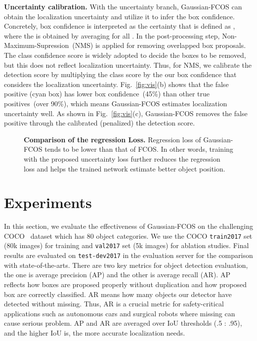\documentclass[final]{cvpr}
\begin{document}
\medskip

\noindent
\textbf{Uncertainty calibration.} With the uncertainty branch, Gaussian-FCOS can obtain the localization uncertainty  and utilize it to infer the box confidence.
Concretely, box confidence is interpreted as the certainty that is defined as , where the  is obtained by averaging  for all . 
In the post-processing step, Non-Maximum-Supression~(NMS) is applied for removing overlapped box proposals. 
The class confidence score is widely adopted to decide the boxes to be removed, but this does not reflect localization uncertainty.
Thus, for NMS, we calibrate the detection score by multiplying the class score by the our box confidence  that considers the localization uncertainty.
Fig.~\ref{fig:vis}(b) shows that the false positive (cyan box) has lower box confidence~(45\%) than other true positives~(over 90\%), which means Gaussian-FCOS estimates localization uncertainty well.
As shown in Fig.~\ref{fig:vis}(c), Gaussian-FCOS removes the false positive through the calibrated (penalized) the detection score.



\begin{figure}[t]
  \centering
  \caption{
    \textbf{Comparison of the regression Loss.} 
    Regression loss of Gaussian-FCOS tends to be lower than that of FCOS. 
In other words, training with the proposed uncertainty loss further reduces the regression loss and helps the trained network estimate better object position.
    }
  \label{fig:loss}
\end{figure}




\section{Experiments}
In this section, we evaluate the effectiveness of Gaussian-FCOS on the challenging COCO~\cite{lin2014microsoft} dataset which has 80 object categories.
We use the COCO \texttt{train2017} set (80k images) for training and \texttt{val2017} set (5k images) for ablation studies.
Final results are evaluated on \texttt{test-dev2017} in the evaluation server for the comparison with state-of-the-arts.
There are two key metrics for object detection evaluation, the one is average precision (AP) and the other is average recall (AR).
AP reflects how boxes are proposed properly without duplication and how proposed box are correctly classified.
AR means how many objects our detector have detected without missing.
Thus, AR is a crucial metric for safety-critical applications such as autonomous cars and surgical robots where missing can cause serious problem.
AP and AR are averaged over IoU thresholds (.5 : .95), and the higher IoU is, the more accurate localization needs. 
\end{document}
